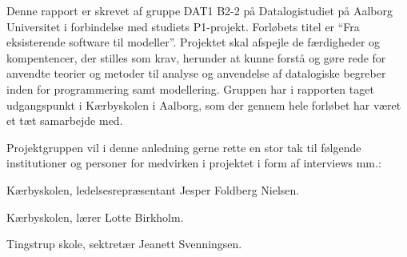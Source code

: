 Denne rapport er skrevet af gruppe DAT1 B2-2 på Datalogistudiet på Aalborg Universitet i forbindelse med studiets P1-projekt. Forløbets titel er ``Fra eksisterende software til modeller''. Projektet skal afspejle de færdigheder og kompentencer, der stilles som krav, herunder at kunne forstå og gøre rede for anvendte teorier og metoder til analyse og anvendelse af datalogiske begreber inden for programmering samt modellering. Gruppen har i rapporten taget udgangspunkt i Kærbyskolen i Aalborg, som der gennem hele forløbet har været et tæt samarbejde med.

Projektgruppen vil i denne anledning gerne rette en stor tak til følgende institutioner og personer for medvirken i projektet i form af interviews mm.:

Kærbyskolen, ledelsesrepræsentant Jesper Foldberg Nielsen.

Kærbyskolen, lærer Lotte Birkholm.

Tingstrup skole, sektretær Jeanett Svenningsen.